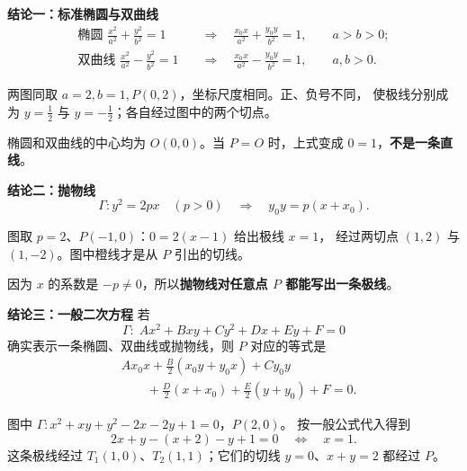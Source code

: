 \begin{statementbox}
\medskip
\begin{minipage}{\linewidth}
\textbf{\textcolor{CStatement}{结论一：标准椭圆与双曲线}}
\begin{align*}
\text{椭圆 }\frac{x^2}{a^2}+\frac{y^2}{b^2}=1
 &\quad\Longrightarrow\quad \boxed{\frac{x_0x}{a^2}+\frac{y_0y}{b^2}=1},\qquad a>b>0;\\
\text{双曲线 }\frac{x^2}{a^2}-\frac{y^2}{b^2}=1
 &\quad\Longrightarrow\quad \boxed{\frac{x_0x}{a^2}-\frac{y_0y}{b^2}=1},\qquad a,b>0.
\end{align*}
\begin{center}

\end{center}
两图同取 $a=2,b=1,P(0,2)$，坐标尺度相同。正、负号不同，
使极线分别成为 $y=\tfrac12$ 与 $y=-\tfrac12$；各自经过图中的两个切点。
\par\smallskip
椭圆和双曲线的中心均为 $O(0,0)$。当 $P=O$ 时，上式变成 $0=1$，\textbf{不是一条直线}。
\end{minipage}
\par\medskip
\begin{minipage}{\linewidth}
\textbf{\textcolor{CStatement}{结论二：抛物线}}
\[
  \Gamma:y^2=2px\quad(p>0)
  \quad\Longrightarrow\quad
  \boxed{y_0y=p(x+x_0)}.
\]
\begin{center}

\end{center}
图取 $p=2$、$P(-1,0)$：$0=2(x-1)$ 给出极线 $x=1$，
经过两切点 $(1,2)$ 与 $(1,-2)$。图中橙线才是从 $P$ 引出的切线。
\par\smallskip
因为 $x$ 的系数是 $-p\ne0$，所以\textbf{抛物线对任意点 $P$ 都能写出一条极线}。
\end{minipage}
\par\medskip
\begin{minipage}{\linewidth}
\textbf{\textcolor{CStatement}{结论三：一般二次方程}}
若
\[
  \Gamma:\; Ax^2+Bxy+Cy^2+Dx+Ey+F=0
\]
确实表示一条椭圆、双曲线或抛物线，则 $P$ 对应的等式是
\[
 \boxed{\begin{aligned}
  &Ax_0x+\frac{B}{2}(x_0y+y_0x)+Cy_0y\\
  &\qquad+\frac{D}{2}(x+x_0)+\frac{E}{2}(y+y_0)+F=0.
 \end{aligned}}
\]
\begin{center}

\end{center}
图中 $\Gamma:x^2+xy+y^2-2x-2y+1=0$，$P(2,0)$。
按一般公式代入得到
\[
  2x+y-(x+2)-y+1=0\quad\Longleftrightarrow\quad x=1.
\]
这条极线经过 $T_1(1,0)$、$T_2(1,1)$；它们的切线 $y=0$、$x+y=2$ 都经过 $P$。

\end{minipage}
\end{statementbox}
